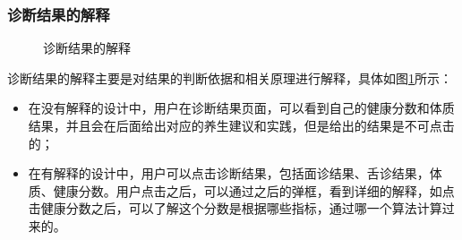 \subsubsection{诊断结果的解释}
\begin{figure}[htbp]
    \centering
    \caption{诊断结果的解释}
    \label{fig:exp_result}
\end{figure}

诊断结果的解释主要是对结果的判断依据和相关原理进行解释，具体如图\ref{fig:exp_result}所示：
\begin{itemize}
    \item 在没有解释的设计中，用户在诊断结果页面，可以看到自己的健康分数和体质结果，并且会在后面给出对应的养生建议和实践，但是给出的结果是不可点击的；
    \item 在有解释的设计中，用户可以点击诊断结果，包括面诊结果、舌诊结果，体质、健康分数。用户点击之后，可以通过之后的弹框，看到详细的解释，如点击健康分数之后，可以了解这个分数是根据哪些指标，通过哪一个算法计算过来的。
\end{itemize}

